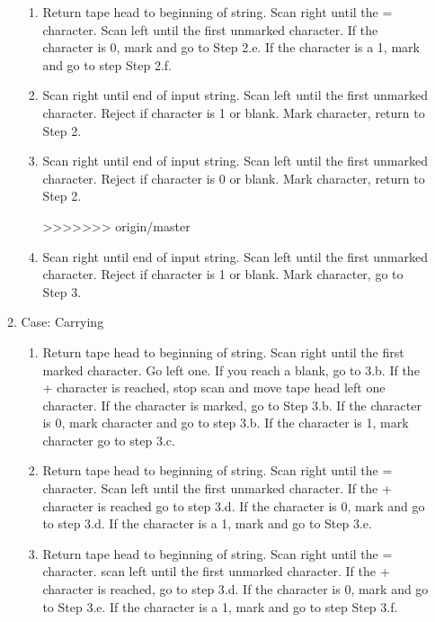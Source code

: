 ﻿\documentclass{article}
\begin{document}
\begin{enumerate}[a)]
\begin{enumerate}[1)]
\begin{enumerate}[(2.a)]
    \item Return tape head to beginning of string. Scan right until the = character. Scan left until the first unmarked character. If the character is 0, mark and go to Step 2.e.  If the character is a 1, mark and go to step Step 2.f.
    
    \item Scan right until end of input string. Scan left until the first unmarked character. Reject if character is 1 or blank. Mark character, return to Step 2.
    
    \item Scan right until end of input string. Scan left until the first unmarked character. Reject if character is 0 or blank. Mark character, return to Step 2.
    
>>>>>>> origin/master
    \item Scan right until end of input string. Scan left until the first unmarked character. Reject if character is 1 or blank. Mark character, go to Step 3.
    

    \end{enumerate}
    
    
\item Case: Carrying

    \begin{enumerate}[(3.a)]
    
<<<<<<< HEAD
    \item Return tape head to beginning of string. Scan right until the first marked character. Go left one. If you reach a blank, go to 3.b. If the + character is reached, stop scan and move tape head left one character. If the character is marked, go to Step 3.b. If the character is 0, mark character and go to step 3.b. If the character is 1, mark character go to step 3.c.
    
    \item Return tape head to beginning of string. Scan right until the = character. Scan left until the first unmarked character. If the + character is reached go to step 3.d. If the character is 0, mark and go to step 3.d.  If the character is a 1, mark and go to Step 3.e.
    
    \item Return tape head to beginning of string. Scan right until the = character. scan left until the first unmarked character. If the + character is reached, go to step 3.d. If the character is 0, mark and go to Step 3.e.  If the character is a 1, mark and go to step Step 3.f.
    

\end{enumerate}
\end{enumerate}
\end{enumerate}
\end{document}
